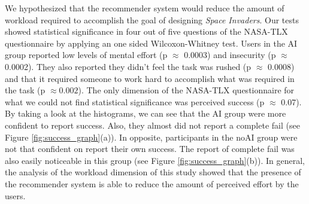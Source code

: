 \documentclass[letterpaper]{article} %
\begin{document}
We hypothesized that the recommender system would reduce the amount of workload required to accomplish the goal of designing \textit{Space Invaders}. Our tests showed statistical significance in four out of five questions of the NASA-TLX questionnaire by applying an one sided Wilcoxon-Whitney test. Users in the AI group reported low levels of mental effort (p $\approx$ 0.0003) and insecurity (p $\approx$ 0.0002). They also reported they didn't feel the task was rushed (p $\approx$ 0.0008) and that it required someone to work hard to accomplish what was required in the task (p $\approx 0.002$). The only dimension of the NASA-TLX questionnaire for what we could not find statistical significance was perceived success (p $\approx$ 0.07). By taking a look at the histograms, we can see that the AI group were more confident to report success. Also, they almost did not report a complete fail (see Figure \ref{fig:success_graph}(a)). In opposite, participants in the noAI group were not that confident on report their own success. The report of complete fail was also easily noticeable in this group (see Figure \ref{fig:success_graph}(b)). In general, the analysis of the workload dimension of this study showed that the presence of the recommender system is able to reduce the amount of perceived effort by the users.
\end{document}
